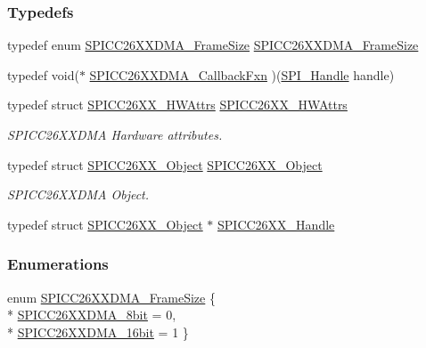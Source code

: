 \subsubsection*{Typedefs}
\begin{DoxyCompactItemize}
\item 
typedef enum \hyperlink{_s_p_i_c_c26_x_x_d_m_a_8h_a1c5afb8465d3e8689a82088ad25fc81a}{S\-P\-I\-C\-C26\-X\-X\-D\-M\-A\-\_\-\-Frame\-Size} \hyperlink{_s_p_i_c_c26_x_x_d_m_a_8h_aa9aa99fc2a0c94cd7aa263ba08eafb92}{S\-P\-I\-C\-C26\-X\-X\-D\-M\-A\-\_\-\-Frame\-Size}
\item 
typedef void($\ast$ \hyperlink{_s_p_i_c_c26_x_x_d_m_a_8h_a0c1ffc13b64215b22bb139ebdafe4a7d}{S\-P\-I\-C\-C26\-X\-X\-D\-M\-A\-\_\-\-Callback\-Fxn} )(\hyperlink{_s_p_i_8h_a728806534c3c3e8675cfbfb7d8e36f13}{S\-P\-I\-\_\-\-Handle} handle)
\item 
typedef struct \hyperlink{struct_s_p_i_c_c26_x_x___h_w_attrs}{S\-P\-I\-C\-C26\-X\-X\-\_\-\-H\-W\-Attrs} \hyperlink{_s_p_i_c_c26_x_x_d_m_a_8h_a21a908cc990ffbb1378d92a68c09ac2a}{S\-P\-I\-C\-C26\-X\-X\-\_\-\-H\-W\-Attrs}
\begin{DoxyCompactList}\small\item\em S\-P\-I\-C\-C26\-X\-X\-D\-M\-A Hardware attributes. \end{DoxyCompactList}\item 
typedef struct \hyperlink{struct_s_p_i_c_c26_x_x___object}{S\-P\-I\-C\-C26\-X\-X\-\_\-\-Object} \hyperlink{_s_p_i_c_c26_x_x_d_m_a_8h_a4e4c18a99d7f9d331ed9d2f21975e8c2}{S\-P\-I\-C\-C26\-X\-X\-\_\-\-Object}
\begin{DoxyCompactList}\small\item\em S\-P\-I\-C\-C26\-X\-X\-D\-M\-A Object. \end{DoxyCompactList}\item 
typedef struct \hyperlink{struct_s_p_i_c_c26_x_x___object}{S\-P\-I\-C\-C26\-X\-X\-\_\-\-Object} $\ast$ \hyperlink{_s_p_i_c_c26_x_x_d_m_a_8h_a4da256c4dcd9175655207a9508358b6c}{S\-P\-I\-C\-C26\-X\-X\-\_\-\-Handle}
\end{DoxyCompactItemize}
\subsubsection*{Enumerations}
\begin{DoxyCompactItemize}
\item 
enum \hyperlink{_s_p_i_c_c26_x_x_d_m_a_8h_a1c5afb8465d3e8689a82088ad25fc81a}{S\-P\-I\-C\-C26\-X\-X\-D\-M\-A\-\_\-\-Frame\-Size} \{ \\*
\hyperlink{_s_p_i_c_c26_x_x_d_m_a_8h_a1c5afb8465d3e8689a82088ad25fc81aae775eeccbba1a059e3cf6ada00472a1b}{S\-P\-I\-C\-C26\-X\-X\-D\-M\-A\-\_\-8bit} = 0, 
\\*
\hyperlink{_s_p_i_c_c26_x_x_d_m_a_8h_a1c5afb8465d3e8689a82088ad25fc81aab7e0c593e19cb06ea65ad293f6fd0971}{S\-P\-I\-C\-C26\-X\-X\-D\-M\-A\-\_\-16bit} = 1
 \}
\end{DoxyCompactItemize}
